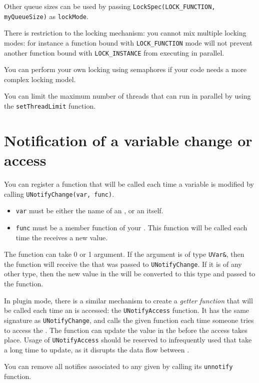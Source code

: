 Other queue sizes can be used by passing
\lstinline{LockSpec(LOCK_FUNCTION, myQueueSize)} as \lstinline{lockMode}.

There is restriction to the locking mechanism: you cannot mix multiple locking
modes: for
instance a function bound with \lstinline{LOCK_FUNCTION} mode will not prevent
another function bound with \lstinline{LOCK_INSTANCE} from executing in
parallel.

You can perform your own locking using semaphores if your code needs a more
complex locking model.

You can limit the maximum number of threads that can run in parallel by using
the \lstinline{setThreadLimit} function.

\section{Notification of a variable change or access}
\label{sec:uobject:uvar-notify}
You can register a function that will be called each time a variable is
modified by calling \lstinline{UNotifyChange(var, func)}.

\begin{itemize}
\item \lstinline{var} must be either the name of an \UVar, or an \UVar itself.
\item \lstinline{func} must be a member function of your \UObject. This function
will be called each time the \UVar receives a new value.
\end{itemize}

The function can take 0 or 1 argument. If the argument is of type
\lstinline{UVar&}, then the function will receive the \UVar that was passed to
\lstinline{UNotifyChange}. If it is of any other type, then the new value in the
\UVar will be converted to this type and passed to the function.

In plugin mode, there is a similar mechanism to create a {\em getter function}
that will be called each time an \UVar is accessed: the
\lstinline{UNotifyAccess} function. It has the same signature as
\lstinline{UNotifyChange}, and calls the given function each time someone tries
to access the \UVar. The function can update the value in the \UVar before
the access takes place. Usage of \lstinline{UNotifyAccess} should be reserved
to infrequently used \UVar that take a long time to update, as it disrupts
the data flow between \UObject.


You can remove all notifies associated to any given \UVar by calling its
\lstinline{unnotify} function.


